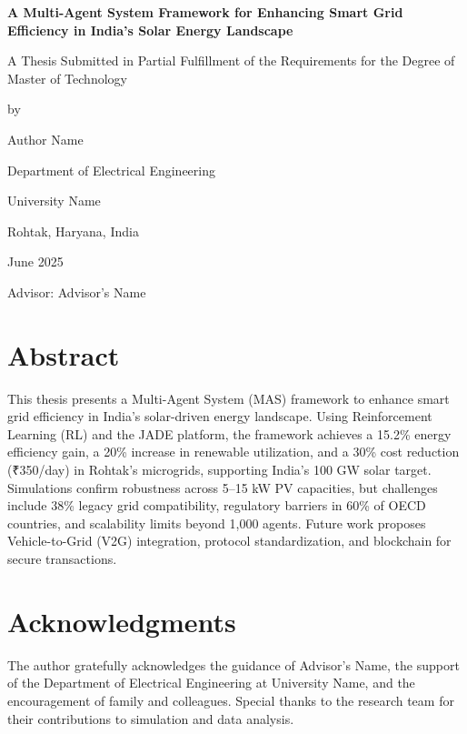\documentclass[12pt]{report}
\begin{document}
\begin{titlepage}
  \centering
  \vspace*{2cm}
  {\LARGE\bfseries A Multi-Agent System Framework for Enhancing Smart Grid Efficiency in India's Solar Energy Landscape}\par
  \vspace{1cm}
  {\large A Thesis Submitted in Partial Fulfillment of the Requirements for the Degree of Master of Technology}\par
  \vspace{1cm}
  {\large by}\par
  {\large Author Name}\par
  \vspace{1cm}
  {\large Department of Electrical Engineering}\par
  {\large University Name}\par
  {\large Rohtak, Haryana, India}\par
  \vspace{0.5cm}
  {\large June 2025}\par
  \vspace{1cm}
  {\large Advisor: Advisor's Name}\par
\end{titlepage}

\clearpage
\section*{Abstract}
This thesis presents a Multi-Agent System (MAS) framework to enhance smart grid efficiency in India's solar-driven energy landscape. Using Reinforcement Learning (RL) and the JADE platform, the framework achieves a 15.2\% energy efficiency gain, a 20\% increase in renewable utilization, and a 30\% cost reduction (₹350/day) in Rohtak's microgrids, supporting India's 100 GW solar target. Simulations confirm robustness across 5--15 kW PV capacities, but challenges include 38\% legacy grid compatibility, regulatory barriers in 60\% of OECD countries, and scalability limits beyond 1,000 agents. Future work proposes Vehicle-to-Grid (V2G) integration, protocol standardization, and blockchain for secure transactions.

\clearpage
\section*{Acknowledgments}
The author gratefully acknowledges the guidance of Advisor's Name, the support of the Department of Electrical Engineering at University Name, and the encouragement of family and colleagues. Special thanks to the research team for their contributions to simulation and data analysis.
\end{document}
